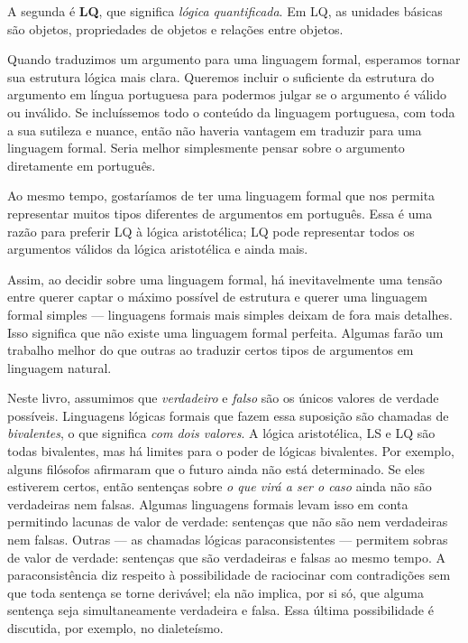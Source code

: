 A segunda é \textbf{LQ}, que significa \emph{lógica quantificada}. Em LQ, as unidades básicas são objetos, propriedades de objetos e relações entre objetos.

Quando traduzimos um argumento para uma linguagem formal, esperamos tornar sua estrutura lógica mais clara. Queremos incluir o suficiente da estrutura do argumento em língua portuguesa para podermos julgar se o argumento é válido ou inválido. Se incluíssemos todo o conteúdo da linguagem portuguesa, com toda a sua sutileza e nuance, então não haveria vantagem em traduzir para uma linguagem formal. Seria melhor simplesmente pensar sobre o argumento diretamente em português.

Ao mesmo tempo, gostaríamos de ter uma linguagem formal que nos permita representar muitos tipos diferentes de argumentos em português. Essa é uma razão para preferir LQ à lógica aristotélica; LQ pode representar todos os argumentos válidos da lógica aristotélica e ainda mais.

Assim, ao decidir sobre uma linguagem formal, há inevitavelmente uma tensão entre querer captar o máximo possível de estrutura e querer uma linguagem formal simples — linguagens formais mais simples deixam de fora mais detalhes. Isso significa que não existe uma linguagem formal perfeita. Algumas farão um trabalho melhor do que outras ao traduzir certos tipos de argumentos em linguagem natural.

Neste livro, assumimos que \emph{verdadeiro} e \emph{falso} são os únicos valores de verdade possíveis. Linguagens lógicas formais que fazem essa suposição são chamadas de \emph{bivalentes}, o que significa \emph{com dois valores}. A lógica aristotélica, LS e LQ são todas bivalentes, mas há limites para o poder de lógicas bivalentes. Por exemplo, alguns filósofos afirmaram que o futuro ainda não está determinado. Se eles estiverem certos, então sentenças sobre \emph{o que virá a ser o caso} ainda não são verdadeiras nem falsas.
Algumas linguagens formais levam isso em conta permitindo lacunas de valor de verdade: sentenças que não são nem verdadeiras nem falsas. Outras — as chamadas lógicas paraconsistentes — permitem sobras de valor de verdade: sentenças que são verdadeiras e falsas ao mesmo tempo. A paraconsistência diz respeito à possibilidade de raciocinar com contradições sem que toda sentença se torne derivável; ela não implica, por si só, que alguma sentença seja simultaneamente verdadeira e falsa. Essa última possibilidade é discutida, por exemplo, no dialeteísmo.

